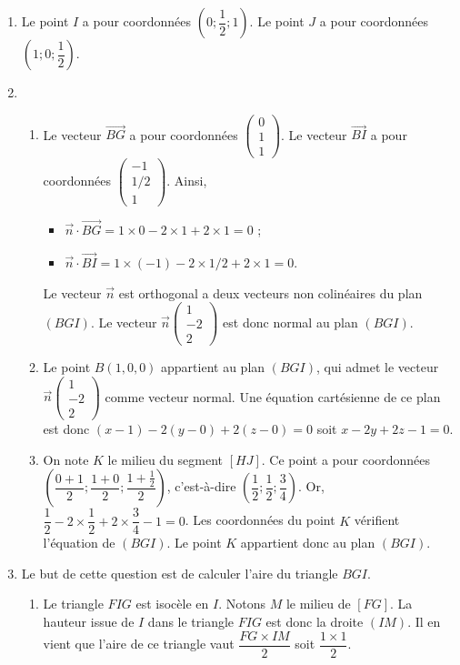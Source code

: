 \documentclass[11pt,fleqn, openany]{book} %
\begin{document}
\begin{solution}\hspace{0pt}
\begin{enumerate}
\item Le point $I$ a pour coordonnées $\left(0 ; \dfrac{1}{2} ; 1\right)$. Le point $J$ a pour coordonnées $\left( 1 ;0 ; \dfrac{1}{2}\right)$.
\vskip5pt
\item \begin{enumerate}
\item Le vecteur $\overrightarrow{BG}$ a pour coordonnées $\begin{pmatrix}0\\1\\1\end{pmatrix} $. Le vecteur $\overrightarrow{BI}$ a pour coordonnées $\begin{pmatrix}-1\\1/2\\1\end{pmatrix} $. Ainsi,
\begin{itemize}
\item $\vec n \cdot \overrightarrow{BG} = 1 \times 0 -2 \times 1 + 2 \times 1 =0$ ;
\item $\vec n \cdot \overrightarrow{BI} = 1 \times (-1) -2 \times 1/2 + 2 \times 1 =0$.\end{itemize}
Le vecteur $\vec n$ est orthogonal a deux vecteurs non colinéaires du plan $(BGI)$. Le vecteur $\vec n \begin{pmatrix} 1 \\ -2 \\ 2 \end{pmatrix}$ est donc normal au plan $(BGI)$.
\item Le point $B(1,0,0)$ appartient au plan $(BGI)$, qui admet le vecteur $\vec n \begin{pmatrix} 1 \\ -2 \\ 2 \end{pmatrix}$ comme vecteur normal. Une équation cartésienne de ce plan est donc $(x-1)-2(y-0)+2(z-0)=0$ soit $x-2y+2z-1=0$.
\vskip5pt
\item On note $K$ le milieu du segment $[HJ]$. Ce point a pour coordonnées $\left(\dfrac{0+1}{2} ; \dfrac{1+0}{2} ; \dfrac{1+\frac{1}{2}}{2}\right)$, c'est-à-dire $\left(\dfrac{1}{2} ; \dfrac{1}{2} ; \dfrac{3}{4}\right)$. Or, $\dfrac{1}{2}-2 \times \dfrac{1}{2}+2 \times \dfrac{3}{4}-1=0$. Les coordonnées du point $K$ vérifient l'équation de $(BGI)$. Le point $K$ appartient donc au plan $(BGI)$.
\end{enumerate}
\vskip10pt
\item Le but de cette question est de calculer l'aire du triangle $BGI$.
\begin{enumerate}
\item Le triangle $FIG$ est isocèle en $I$. Notons $M$ le milieu de $[FG]$. La hauteur issue de $I$ dans le triangle $FIG$ est donc la droite $(IM)$. Il en vient que l'aire de ce triangle vaut $\dfrac{FG \times IM}{2}$ soit $\dfrac{1 \times 1}{2}$.


\end{enumerate}
\end{enumerate}
\end{solution}
\end{document}
